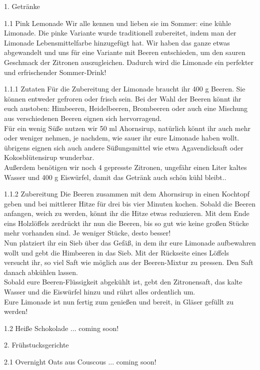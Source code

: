 
	1. Getränke
	
	1.1 Pink Lemonade
	Wir alle kennen und lieben sie im Sommer: eine kühle Limonade. Die pinke Variante wurde traditionell zubereitet, indem man der Limonade Lebensmittelfarbe hinzugefügt hat. Wir haben das ganze etwas abgewandelt und uns für eine Variante mit Beeren entschieden, um den sauren Geschmack der Zitronen auszugleichen. Dadurch wird die Limonade ein perfekter und erfrischender Sommer-Drink!
	
	1.1.1 Zutaten
	Für die Zubereitung der Limonade braucht ihr 400 g Beeren. Sie können entweder gefroren oder frisch sein. Bei der Wahl der Beeren könnt ihr euch austoben: Himbeeren, Heidelbeeren, Brombeeren oder auch eine Mischung aus verschiedenen Beeren eignen sich hervorragend. \\
	Für ein wenig Süße nutzen wir 50 ml Ahornsirup, natürlich könnt ihr auch mehr oder weniger nehmen, je nachdem, wie sauer ihr eure Limonade haben wollt. übrigens eignen sich auch andere Süßungsmittel wie etwa Agavendicksaft oder Kokosblütensirup wunderbar. \\
	Außerdem benötigen wir noch 4 gepresste Zitronen, ungefähr einen Liter kaltes Wasser und 400 g Eiswürfel, damit das Getränk auch schön kühl bleibt..
	
	1.1.2 Zubereitung
	Die Beeren zusammen mit dem Ahornsirup in einen Kochtopf geben und bei mittlerer Hitze für drei bis vier Minuten kochen. Sobald die Beeren anfangen, weich zu werden, könnt ihr die Hitze etwas reduzieren. Mit dem Ende eins Holzlöffels zerdrückt ihr nun die Beeren, bis so gut wie keine großen Stücke mehr vorhanden sind. Je weniger Stücke, desto besser! \\
	Nun platziert ihr ein Sieb über das Gefäß, in dem ihr eure Limonade aufbewahren wollt und gebt die Himbeeren in das Sieb. Mit der Rückseite eines Löffels versucht ihr, so viel Saft wie möglich aus der Beeren-Mixtur zu pressen. Den Saft danach abkühlen lassen. \\
	Sobald eure Beeren-Flüssigkeit abgekühlt ist, gebt den Zitronensaft, das kalte Wasser und die Eiswürfel hinzu und rührt alles ordentlich um. \\
	Eure Limonade ist nun fertig zum genießen und bereit, in Gläser gefüllt zu werden!
	
	1.2 Heiße Schokolade
	... coming soon!
	
	2. Frühstucksgerichte
	
	2.1 Overnight Oats aus Couscous
	... coming soon!
	